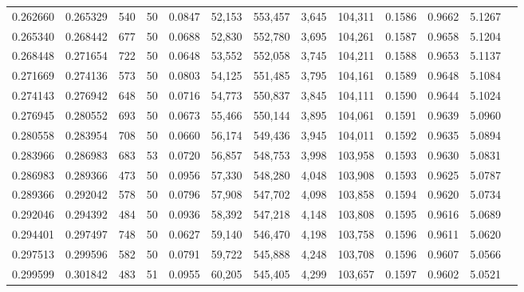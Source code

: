 \begin{tabular}{rrrrrrrrrrrrr}
0.262660 & 0.265329 &   540 &  50 &                                     0.0847 &  52,153 & 553,457 &   3,645 & 104,311 & 0.1586 & 0.9662 & 5.1267 \\
0.265340 & 0.268442 &   677 &  50 &                                     0.0688 &  52,830 & 552,780 &   3,695 & 104,261 & 0.1587 & 0.9658 & 5.1204 \\
0.268448 & 0.271654 &   722 &  50 &                                     0.0648 &  53,552 & 552,058 &   3,745 & 104,211 & 0.1588 & 0.9653 & 5.1137 \\
0.271669 & 0.274136 &   573 &  50 &                                     0.0803 &  54,125 & 551,485 &   3,795 & 104,161 & 0.1589 & 0.9648 & 5.1084 \\
0.274143 & 0.276942 &   648 &  50 &                                     0.0716 &  54,773 & 550,837 &   3,845 & 104,111 & 0.1590 & 0.9644 & 5.1024 \\
0.276945 & 0.280552 &   693 &  50 &                                     0.0673 &  55,466 & 550,144 &   3,895 & 104,061 & 0.1591 & 0.9639 & 5.0960 \\
0.280558 & 0.283954 &   708 &  50 &                                     0.0660 &  56,174 & 549,436 &   3,945 & 104,011 & 0.1592 & 0.9635 & 5.0894 \\
0.283966 & 0.286983 &   683 &  53 &                                     0.0720 &  56,857 & 548,753 &   3,998 & 103,958 & 0.1593 & 0.9630 & 5.0831 \\
0.286983 & 0.289366 &   473 &  50 &                                     0.0956 &  57,330 & 548,280 &   4,048 & 103,908 & 0.1593 & 0.9625 & 5.0787 \\
0.289366 & 0.292042 &   578 &  50 &                                     0.0796 &  57,908 & 547,702 &   4,098 & 103,858 & 0.1594 & 0.9620 & 5.0734 \\
0.292046 & 0.294392 &   484 &  50 &                                     0.0936 &  58,392 & 547,218 &   4,148 & 103,808 & 0.1595 & 0.9616 & 5.0689 \\
0.294401 & 0.297497 &   748 &  50 &                                     0.0627 &  59,140 & 546,470 &   4,198 & 103,758 & 0.1596 & 0.9611 & 5.0620 \\
0.297513 & 0.299596 &   582 &  50 &                                     0.0791 &  59,722 & 545,888 &   4,248 & 103,708 & 0.1596 & 0.9607 & 5.0566 \\
0.299599 & 0.301842 &   483 &  51 &                                     0.0955 &  60,205 & 545,405 &   4,299 & 103,657 & 0.1597 & 0.9602 & 5.0521 \\

\end{tabular}
